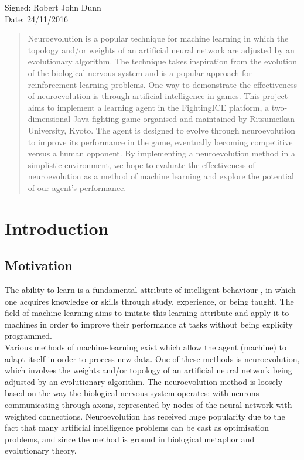 \documentclass[12pt,a4paper]{article}
\begin{document}
Signed: Robert John Dunn\\

Date: 24/11/2016 
\newpage
\thispagestyle{empty}
\begin{abstract}
Neuroevolution is a popular technique for machine learning in which the topology and/or weights of an artificial neural network are adjusted by an evolutionary algorithm. The technique takes inspiration from the evolution of the biological nervous system and is a popular approach for reinforcement learning problems. One way to demonstrate the effectiveness of neuroevolution is through artificial intelligence in games. This project aims to implement a learning agent in the FightingICE platform, a two-dimensional Java fighting game organised and maintained by Ritsumeikan University, Kyoto. The agent is designed to evolve through neuroevolution to improve its performance in the game, eventually becoming competitive versus a human opponent. By implementing a neuroevolution method in a simplistic environment, we hope to evaluate the effectiveness of neuroevolution as a method of machine learning and explore the potential of our agent's performance.
\end{abstract}
\newpage
\thispagestyle{empty}
\tableofcontents
\newpage
\section{Introduction}
\subsection{Motivation}
The ability to learn is a fundamental attribute of intelligent behaviour \cite{michalski}, in which one acquires knowledge or skills through study, experience, or being taught. The field of machine-learning aims to imitate this learning attribute and apply it to machines in order to improve their performance at tasks without being explicity programmed.\\

Various methods of machine-learning exist which allow the agent (machine) to adapt itself in order to process new data. One of these methods is neuroevolution, which involves the weights and/or topology of an artificial neural network being adjusted by an evolutionary algorithm. The neuroevolution method is loosely based on the way the biological nervous system operates: with neurons communicating through axons, represented by nodes of the neural network with weighted connections. Neuroevolution has received huge popularity due to the fact that many artificial intelligence problems can be cast as optimisation problems, and since the method is ground in biological metaphor and evolutionary theory. \cite{risi}\\
\end{document}
